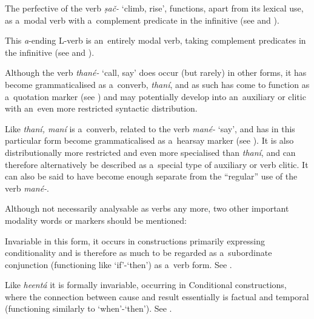  The perfective of the verb \textit{ṣač-} `climb, rise', functions, apart from its lexical use, as a~modal verb with a~complement predicate in the infinitive (see  and ). 



 This \textit{a}-ending L-verb is an~entirely modal verb, taking complement predicates in the infinitive (see  and ).



 Although the verb \textit{thané-} `call, say' does occur (but rarely) in other forms, it has become grammaticalised as a~converb, \textit{thaní}, and as such has come to function as a~quotation marker (see ) and may potentially develop into an~auxiliary or clitic with an~even more restricted syntactic distribution.



 Like \textit{thaní, maní} is a~converb, related to the verb \textit{mané-} `say', and has in this particular form become grammaticalised as a~hearsay marker (see ). It is also distributionally more restricted and even more specialised than \textit{thaní}, and can therefore alternatively be described as a~special type of auxiliary or verb clitic. It can also be said to have become enough separate from the ``regular'' use of the verb \textit{mané-}.



Although not necessarily analysable as verbs any more, two other important modality words or markers should be mentioned:



 Invariable in this form, it occurs in constructions primarily expressing conditionality and is therefore as much to be regarded as a~subordinate conjunction (functioning like `if'-`then') as a~verb form. See .



 Like \textit{heentá} it is formally invariable, occurring in Conditional constructions, where the connection between cause and result essentially is factual and temporal (functioning similarly to `when'-`then'). See .


